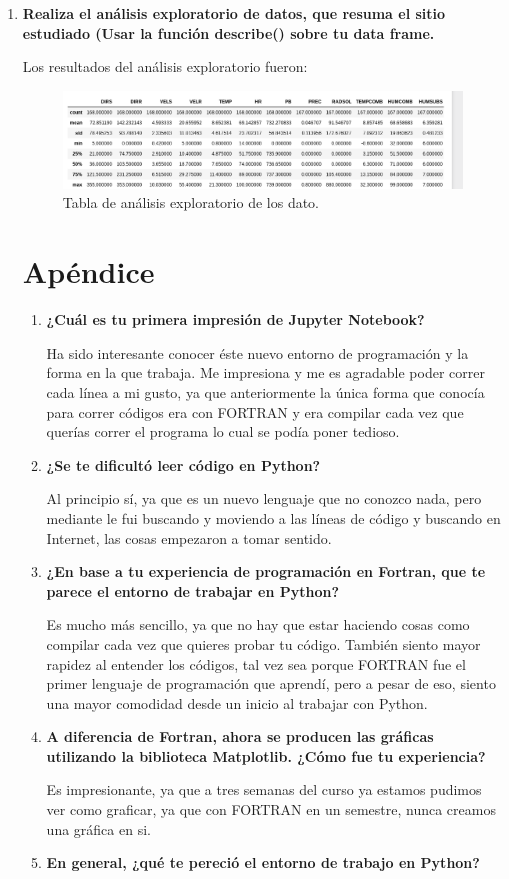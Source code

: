 \documentclass[a4paper]{article}
\begin{document}
\begin{enumerate}
\item\textbf{Realiza el análisis exploratorio de datos, que resuma el sitio estudiado (Usar la función describe() sobre tu data frame.}

Los resultados del análisis exploratorio fueron:
\begin{figure}[h!]
  \centering
  \includegraphics[width=0.6\linewidth]{ActExplor.png}
  \caption{Tabla de análisis exploratorio de los dato.}
\end{figure}

\section{Apéndice}
\begin{enumerate}
\item \textbf{¿Cuál es tu primera impresión de Jupyter Notebook?}

Ha sido interesante conocer éste nuevo entorno de programación y la forma en la que trabaja. Me impresiona y me es agradable poder correr cada línea a mi gusto, ya que anteriormente la única forma que conocía para correr códigos era con FORTRAN y era compilar cada vez que querías correr el programa lo cual se podía poner tedioso. 
\item \textbf{¿Se te dificultó leer código en Python?}

Al principio sí, ya que es un nuevo lenguaje que no conozco nada, pero mediante le fui buscando y moviendo a las líneas de código y buscando en Internet, las cosas empezaron a tomar sentido. 
\item \textbf{¿En base a tu experiencia de programación en Fortran, que te parece el entorno de trabajar en Python?}

Es mucho más sencillo, ya que no hay que estar haciendo cosas como compilar cada vez que quieres probar tu código. También siento mayor rapidez al entender los códigos, tal vez sea porque FORTRAN fue el primer lenguaje de programación que aprendí, pero a pesar de eso, siento una mayor comodidad desde un inicio al trabajar con Python.
\item \textbf{A diferencia de Fortran, ahora se producen las gráficas utilizando la biblioteca Matplotlib. ¿Cómo fue tu experiencia?}

Es impresionante, ya que a tres semanas del curso ya estamos pudimos ver como graficar, ya que con FORTRAN en un semestre, nunca creamos una gráfica en si. 
\item \textbf{En general, ¿qué te pereció el entorno de trabajo en Python?}


\end{enumerate}
\end{enumerate}
\end{document}
